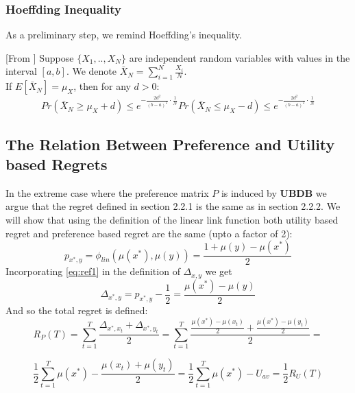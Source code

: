 \documentclass{llncs}
\begin{document}
	\subsubsection{Hoeffding Inequality}	
	As a preliminary step, we remind Hoeffding’s inequality.
	\begin{theorem}\label{thm:Hoeffding}[From \cite{...}]
	Suppose $\{X_1,..,X_N \}$ are independent random variables with values in the interval $[a,b]$.
	We denote $\bar{X}_N = \sum_{i=1}^N \frac{X_i}{N}$.\\
	If $E[\bar{X}_N] = \mu_X$, then for any $d>0$:
	\begin{subequations}
	\begin{equation}
	Pr(\bar{X}_N \geq \mu_X+ d) \leq e^{-\frac{2d^2}{(b-a)^2}\cdot\frac{1}{N}}
	\end{equation}
	\begin{equation}
	Pr(\bar{X}_N \leq \mu_X- d) \leq e^{-\frac{2d^2}{(b-a)^2}\cdot\frac{1}{N}}
	\end{equation}
	\end{subequations}
	\end{theorem}
	\subsection{The Relation Between Preference and Utility based Regrets}
	
	In the extreme case where the preference matrix $P$ is induced by \textbf{UBDB} we argue that the regret defined in  section 2.2.1 is the same as in  section 2.2.2. 
	We will show that using the definition of the linear link function both utility based regret and preference based regret are the same (upto a factor of 2): 
	\begin{equation}\label{eq:ref1}
		p_{x^*,y} = \phi_{lin}(\mu(x^*),\mu(y)) = \frac{1 +\mu(y)-\mu(x^*)}{2}
	\end{equation}
	Incorporating \eqref{eq:ref1} in the definition of $\Delta_{x,y}$ we get
	$$
	\Delta_{x^*,y} = p_{x^*,y} - \frac{1}{2} = \frac{\mu(x^*)-\mu(y)}{2}
	$$
	And so the total regret is defined:
	$$ R_P(T) = \sum_{t=1}^T \frac{\Delta_{x^*,x_t}+\Delta_{x^*,y_t}}{2} =  
\sum_{t=1}^T \frac{\frac{\mu(x^*)-\mu(x_t)}{2}+\frac{\mu(x^*)-\mu(y_t)}{2}}{2} =
$$

$$
\frac{1}{2} \sum_{t=1}^T \mu(x^*) -\frac{
	\mu(x_t)+\mu(y_t)}{2} =
\frac{1}{2} \sum_{t=1}^T \mu(x^*)- U_{av} = \frac{1}{2}R_U(T)$$
\end{document}

